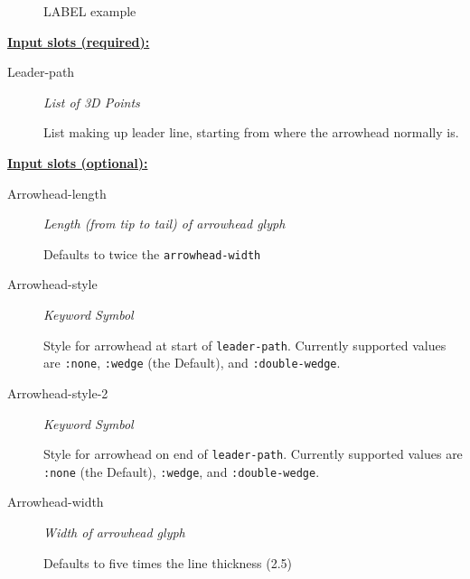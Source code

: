 \documentclass [11pt]{book}
\begin{document}
\begin{itemize}
\begin{figure}
\caption{LABEL example}

\label{fig:LABEL}

\end{figure}





\textbf{
\underline{Input slots (required):}}

\begin{description}

\item [Leader-path]
\emph{List of 3D Points}

 List making up leader line, starting from where the arrowhead normally is.




\end{description}






\textbf{
\underline{Input slots (optional):}}

\begin{description}

\item [Arrowhead-length]
\emph{Length (from tip to tail) of arrowhead glyph}

 Defaults to twice the \texttt{arrowhead-width}




\item [Arrowhead-style]
\emph{Keyword Symbol}

 Style for arrowhead at start of \texttt{leader-path}. Currently supported values
are \texttt{:none}, \texttt{:wedge}  (the Default), and \texttt{:double-wedge}.




\item [Arrowhead-style-2]
\emph{Keyword Symbol}

 Style for arrowhead on end of \texttt{leader-path}. Currently supported values
are \texttt{:none} (the Default), \texttt{:wedge}, and \texttt{:double-wedge}.




\item [Arrowhead-width]
\emph{Width of arrowhead glyph}

 Defaults to five times the line thickness (2.5)





\end{description}
\end{itemize}
\end{document}
